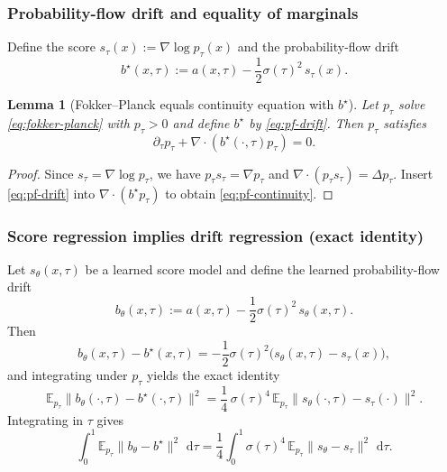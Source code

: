 \documentclass{article}
\numberwithin{equation}{section}
\theoremstyle{plain}
\newtheorem{lemma}[theorem]{Lemma}
\theoremstyle{definition}
\theoremstyle{remark}
\newcommand{\E}{\mathbb{E}}
\newcommand{\dd}{\,\mathrm{d}}
\begin{document}
\subsubsection{Probability-flow drift and equality of marginals}

Define the score $s_\tau(x):=\nabla\log p_\tau(x)$ and the probability-flow drift
\begin{equation}\label{eq:pf-drift}
b^\star(x,\tau):=a(x,\tau)-\frac12\sigma(\tau)^2\,s_\tau(x).
\end{equation}

\begin{lemma}[Fokker--Planck equals continuity equation with $b^\star$]\label{lem:fp-to-ce}
Let $p_\tau$ solve \eqref{eq:fokker-planck} with $p_\tau>0$ and define $b^\star$ by \eqref{eq:pf-drift}.
Then $p_\tau$ satisfies
\begin{equation}\label{eq:pf-continuity}
\partial_\tau p_\tau + \nabla\cdot(b^\star(\cdot,\tau)p_\tau)=0.
\end{equation}
\end{lemma}

\begin{proof}
Since $s_\tau=\nabla\log p_\tau$, we have $p_\tau s_\tau=\nabla p_\tau$ and $\nabla\cdot(p_\tau s_\tau)=\Delta p_\tau$.
Insert \eqref{eq:pf-drift} into $\nabla\cdot(b^\star p_\tau)$ to obtain \eqref{eq:pf-continuity}.
\end{proof}

\subsubsection{Score regression implies drift regression (exact identity)}

Let $s_\theta(x,\tau)$ be a learned score model and define the learned probability-flow drift
\begin{equation}\label{eq:pf-drift-learned}
b_\theta(x,\tau):=a(x,\tau)-\frac12\sigma(\tau)^2\,s_\theta(x,\tau).
\end{equation}
Then
\[
b_\theta(x,\tau)-b^\star(x,\tau)=-\frac12\sigma(\tau)^2\big(s_\theta(x,\tau)-s_\tau(x)\big),
\]
and integrating under $p_\tau$ yields the exact identity
\begin{equation}\label{eq:drift-vs-score-identity}
\E_{p_\tau}\|b_\theta(\cdot,\tau)-b^\star(\cdot,\tau)\|^2
=
\frac14\,\sigma(\tau)^4\,\E_{p_\tau}\|s_\theta(\cdot,\tau)-s_\tau(\cdot)\|^2.
\end{equation}
Integrating in $\tau$ gives
\begin{equation}\label{eq:drift-vs-score-integrated}
\int_0^1 \E_{p_\tau}\|b_\theta-b^\star\|^2\,\dd\tau
=
\frac14\int_0^1 \sigma(\tau)^4\,\E_{p_\tau}\|s_\theta-s_\tau\|^2\,\dd\tau.
\end{equation}
\end{document}

